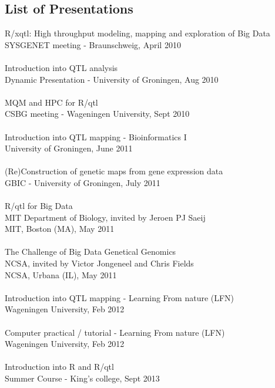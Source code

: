 \subsection{List of Presentations}
R/xqtl: High throughput modeling, mapping and exploration of Big Data\\
SYSGENET meeting - Braunschweig, April 2010\\\\
Introduction into QTL analysis\\
Dynamic Presentation - University of Groningen, Aug 2010\\\\
MQM and HPC for R/qtl\\
CSBG meeting - Wageningen University, Sept 2010\\\\
Introduction into QTL mapping - Bioinformatics I\\
University of Groningen, June 2011\\\\
(Re)Construction of genetic maps from gene expression data\\
GBIC - University of Groningen, July 2011\\\\
R/qtl for Big Data\\
MIT Department of Biology, invited by Jeroen PJ Saeij\\
MIT, Boston (MA), May 2011\\\\
The Challenge of Big Data Genetical Genomics\\
NCSA, invited by Victor Jongeneel and Chris Fields\\
NCSA, Urbana (IL), May 2011\\\\
Introduction into QTL mapping - Learning From nature (LFN)\\
Wageningen University, Feb 2012\\\\
Computer practical / tutorial - Learning From nature (LFN)\\
Wageningen University, Feb 2012\\\\
Introduction into R and R/qtl\\
Summer Course - King's college, Sept 2013\\\\

